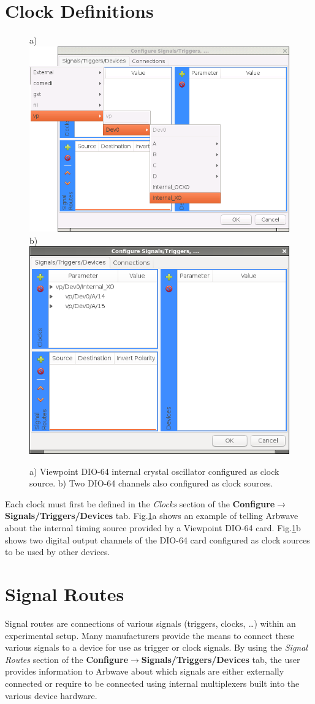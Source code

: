 \section{Clock Definitions}\label{sec:devcfg:clkdef}
\begin{figure}[ht!]
  \centerline{
    a) \includegraphics[width=.46\textwidth]{figures/add-clock-vp-XO}
    \hspace{.2em}
    b) \includegraphics[width=.46\textwidth]{figures/clocks-added}
  }
  \caption{
    a) Viewpoint DIO-64 internal crystal oscillator configured as clock source.
    b) Two DIO-64 channels also configured as clock sources.
  }
  \label{fig:devcfg:clocks-added}
\end{figure}
%
%
Each clock must first be defined in the \textit{Clocks} section of the
\textbf{Configure$\rightarrow$Signals/Triggers/Devices} tab.
Fig.\ref{fig:devcfg:clocks-added}a shows an example of telling Arbwave about the
internal timing source provided by a Viewpoint DIO-64 card.
Fig.\ref{fig:devcfg:clocks-added}b shows two digital output channels of the
DIO-64 card configured as clock sources to be used by other devices.



\section{Signal Routes}\label{sec:devcfg:routes}
Signal routes are connections of various signals (triggers, clocks, \ldots)
within an experimental setup.  Many manufacturers provide the means to
connect these various signals to a device for use as trigger or clock signals.  By
using the \textit{Signal Routes} section of the
\textbf{Configure$\rightarrow$Signals/Triggers/Devices} tab, the user provides
information to Arbwave about which signals are either externally connected or
require to be connected using internal multiplexers built into the
various device hardware.

